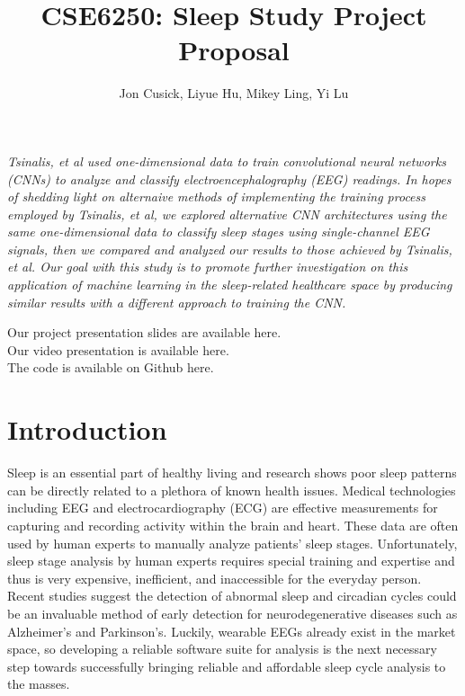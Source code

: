 \documentclass{amia}
\begin{document}
\title{CSE6250: Sleep Study Project Proposal}

\author{Jon Cusick, Liyue Hu, Mikey Ling, Yi Lu}


\maketitle


\textit{Tsinalis, et al used one-dimensional data to train convolutional neural networks (CNNs) to analyze and classify electroencephalography (EEG) readings\cite{ref_Tsinalis2016}. In hopes of shedding light on alternaive methods of implementing the training process employed by Tsinalis, et al, we explored alternative CNN architectures using the same one-dimensional data to classify sleep stages using single-channel EEG signals, then we compared and analyzed our results to those achieved by Tsinalis, et al. Our goal with this study is to promote further investigation on this application of machine learning in the sleep-related healthcare space by producing similar results with a different approach to training the CNN.}

Our project presentation slides are available here.\\
Our video presentation is available here.\\
The code is available on Github here. 

\section*{Introduction}
Sleep is an essential part of healthy living and research shows poor sleep patterns can be directly related to a plethora of known health issues\cite{ref_Wulff2010}. Medical technologies including EEG and electrocardiography (ECG) are effective measurements for capturing and recording activity within the brain and heart. These data are often used by human experts to manually analyze patients' sleep stages. Unfortunately, sleep stage analysis by human experts requires special training and expertise and thus is very expensive, inefficient, and inaccessible for the everyday person. Recent studies suggest the detection of abnormal sleep and circadian cycles could be an invaluable method of early detection for neurodegenerative diseases such as Alzheimer's and Parkinson's\cite{ref_Wulff2010}. Luckily, wearable EEGs already exist in the market space, so developing a reliable software suite for analysis is the next necessary step towards successfully bringing reliable and affordable sleep cycle analysis to the masses.
\end{document}
